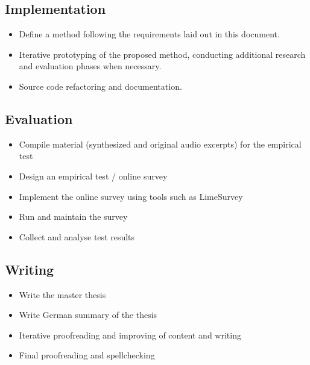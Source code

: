 \subsection*{Implementation}
\begin{itemize}
    \item Define a method following the requirements laid out in this document.
    \item Iterative prototyping of the proposed method, conducting additional research and evaluation phases when necessary. 
    \item Source code refactoring and documentation.
\end{itemize}


\subsection*{Evaluation}
\begin{itemize}
    \item Compile material (synthesized and original audio excerpts) for the empirical test
    \item Design an empirical test / online survey
    \item Implement the online survey using tools such as LimeSurvey
    \item Run and maintain the survey
    \item Collect and analyse test results 
\end{itemize}

\subsection*{Writing}
\begin{itemize}
    \item Write the master thesis 
    \item Write German summary of the thesis
    \item Iterative proofreading and improving of content and writing
    \item Final proofreading and spellchecking
\end{itemize}
